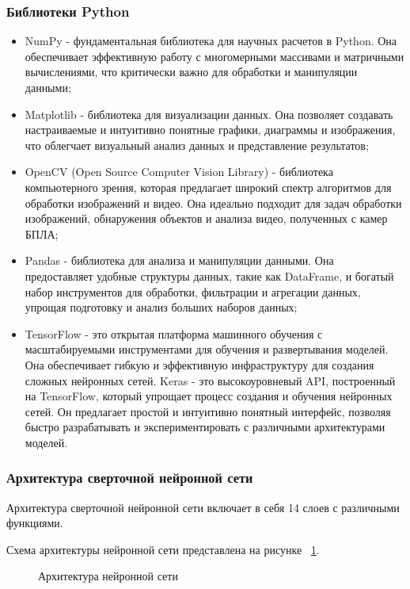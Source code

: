 \subsubsection{Библиотеки Python}

\begin{itemize}
\item NumPy - фундаментальная библиотека для научных расчетов в Python. Она обеспечивает эффективную работу с многомерными массивами и матричными вычислениями, что критически важно для обработки и манипуляции данными;
\item Matplotlib - библиотека для визуализации данных. Она позволяет создавать настраиваемые и интуитивно понятные графики, диаграммы и изображения, что облегчает визуальный анализ данных и представление результатов;
\item OpenCV (Open Source Computer Vision Library) - библиотека компьютерного зрения, которая предлагает широкий спектр алгоритмов для обработки изображений и видео. Она идеально подходит для задач обработки изображений, обнаружения объектов и анализа видео, полученных с камер БПЛА;
\item Pandas - библиотека для анализа и манипуляции данными. Она предоставляет удобные структуры данных, такие как DataFrame, и богатый набор инструментов для обработки, фильтрации и агрегации данных, упрощая подготовку и анализ больших наборов данных;
\item TensorFlow - это открытая платформа машинного обучения с масштабируемыми инструментами для обучения и развертывания моделей. Она обеспечивает гибкую и эффективную инфраструктуру для создания сложных нейронных сетей. Keras - это высокоуровневый API, построенный на TensorFlow, который упрощает процесс создания и обучения нейронных сетей. Он предлагает простой и интуитивно понятный интерфейс, позволяя быстро разрабатывать и экспериментировать с различными архитектурами моделей.
\end{itemize}

\subsubsection{Архитектура сверточной нейронной сети}

Архитектура сверточной нейронной сети включает в себя 14 слоев с различными функциями.

Схема архитектуры нейронной сети представлена на рисунке ~\ref{archNC:image}.

\begin{figure}[H]
\caption{Архитектура нейронной сети}
\label{archNC:image}
\end{figure}

